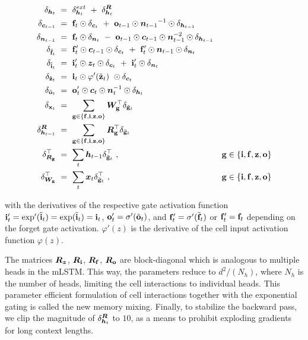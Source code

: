 \documentclass[dvipsnames]{article}
\begin{document}
\begin{appendix}
\begin{align}
	\delta_{\Bh_t} \ &= \ \delta^{ext}_{\Bh_t} \ + \ \delta^{\BR}_{\Bh_t}  &\\
	\delta_{\Bc_{t-1}} \ &= \ \bff_{t} \odot \delta_{\Bc_{t}} \ + \ \bfo_{t-1}  \odot {\Bn_{t-1}}^{-1} \odot \delta_{\Bh_{t-1}} &  \\
		\delta_{\Bn_{t-1}} \ &= \ \bff_{t} \odot \delta_{\Bn_{t}} \ - \ \bfo_{t-1} \odot \Bc_{t-1} \odot \Bn_{t-1}^{-2}  \odot \delta_{\Bh_{t-1}} & \\	
\delta_{\tilde{\bff}_{t}} \ &= \ \bff'_{t} \odot \Bc_{t-1} \odot \delta_{\Bc_{t}}  \ + \ \bff'_{t} \odot \Bn_{t-1} \odot \delta_{\Bn_{t}}  & \\
\delta_{\tilde{\bfi}_{t}} \ &= \ \bfi'_{t} \odot \Bz_{t} \odot \delta_{\Bc_{t}} \ + \  \bfi'_{t} \odot \delta_{\Bn_{t}} & \\
\delta_{\tilde{\bfz}_{t}} \ &= \ \bfi_{t} \odot \varphi'(\tilde{\bfz}_t) \ \odot \delta_{\Bc_{t}} & \\
\delta_{\tilde{\bfo}_{t}} \ &= \ \bfo'_{t} \odot \Bc_{t} \odot \Bn^{-1}_{t} \odot \delta_{\Bh_{t}}  & \\
\delta_{\bfx_t} \ &= \ \sum_{\bfg \in \{\bff, \bfi, \bfz, \bfo\}} \BW^{\top}_{\bfg} \delta_{\tilde{\bfg}_t} & \\
\delta^{\BR}_{\Bh_{t-1}} \ &= \ \sum_{\bfg \in \{\bff, \bfi, \bfz, \bfo\}} \BR^{\top}_{\bfg} \delta_{\tilde{\bfg}_{t}} &\\
\delta_{\BR_\bfg}^\top \ &= \ \sum_t \Bh_{t-1} \delta_{\tilde{\bfg}_{t}}^\top \ , & \bfg \in \{\bfi, \bff, \bfz, \bfo\}\\
\delta_{\BW_\bfg}^\top \ &= \ \sum_t \Bx_{t} \delta_{\tilde{\bfg}_{t}}^\top \ , &  \bfg \in \{\bfi, \bff, \bfz, \bfo\}
\end{align}

with the derivatives of the respective gate activation function $\mathbf{i}'_t = \exp' (\tilde{\mathbf{i}}_t ) = \exp (\tilde{\mathbf{i}}_t ) = \mathbf{i}_t $, $\mathbf{o}'_t = \sigma' (\tilde{\mathbf{o}}_t) $, and $\mathbf{f}'_t = \sigma'(\tilde{\mathbf{f}}_t) $ or $\mathbf{f}'_t = \mathbf{f}_t$ depending on the forget gate activation. $\varphi'(z)$ is the derivative of the cell input activation function $\varphi(z)$.

The matrices $\bm{R}_{\bm{z}}$, $\bm{R}_{\mathbf{i}}$, $\bm{R}_{\mathbf{f}}$, $\bm{R}_{\mathbf{o}}$ are block-diagonal which is analogous to multiple heads in the mLSTM. This way, the parameters reduce to $d^2/(N_h)$, where $N_h$ is the number of heads, limiting the cell interactions to individual heads. This parameter efficient formulation of cell interactions together with the exponential gating is called the new memory mixing. Finally, to stabilize the backward pass, we clip the magnitude of $\delta^{\bm{R}}_{\bm{h}_t}$ to $10$, as a means to prohibit exploding gradients for long context lengths.


\end{appendix}
\end{document}
